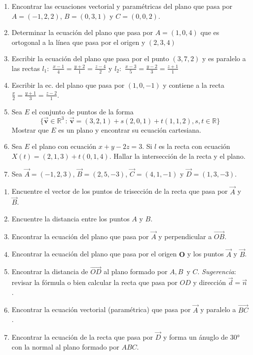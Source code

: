 \documentclass[
]{article}
\begin{document}
\begin{enumerate}
\def\labelenumi{\arabic{enumi}.}
\item
  Encontrar las ecuaciones vectorial y paramétricas del plano que pasa
  por \(A=(-1,2,2)\), \(B=(0,3,1)\) y \(C=(0,0,2)\).
\item
  Determinar la ecuación del plano que pasa por \(A=(1,0,4)\) que es
  ortogonal a la línea que pasa por el origen y \((2,3,4)\)
\item
  Escribir la ecuación del plano que pasa por el punto \((3,7,2)\) y es
  paralelo a las rectas \(l_1:\)
  \(\frac{x-1}{4}=\frac{y+2}{1}=\frac{z-4}{2}\) y \(l_2:\)
  \(\frac{x-3}{5}=\frac{y-2}{3}=\frac{z+1}{1}\)
\item
  Escribir la ec. del plano que pasa por \((1,0,-1)\) y contiene a la
  recta \(\frac{x}{2}=\frac{y+1}{3}=\frac{z-2}{1}\).
\item
  Sea \(E\) el conjunto de puntos de la forma \[
    \{ \vec{\mathbf{v}} \in \mathbb{R}^{3} \,:\, \vec{\mathbf{v}} = (3,2,1) + s (2,0,1) + t(1,1,2), s,t\in\mathbb{R}   \}
    \] Mostrar que \(E\) es un plano y encontrar su ecuación cartesiana.
\item
  Sea \(E\) el plano con ecuación \(x+y-2z=3\). Si \(l\) es la recta con
  ecuación \(X(t)=(2,1,3) + t(0,1,4)\). Hallar la intersección de la
  recta y el plano.
\item
  Sea \(\vec{A}=(-1,2,3)\), \(\vec{B}=(2,5,-3)\), \(\vec{C}=(4,1,-1)\) y
  \(\vec{D}=(1,3,-3)\).
\end{enumerate}

\begin{enumerate}
\def\labelenumi{\alph{enumi})}
\item
  Encuentre el vector de los puntos de trisección de la recta que pasa
  por \(\vec{A}\) y \(\vec{B}\).
\item
  Encuentre la distancia entre los puntos \(A\) y \(B\).
\item
  Encontrar la ecuación del plano que pasa por \(\vec{A}\) y
  perpendicular a \(\vec{OB}\).
\item
  Encontrar la ecuación del plano que pasa por el origen \(\textbf{O}\)
  y los puntos \(\vec{A}\) y \(\vec{B}\).
\item
  Encontrar la distancia de \(\vec{OD}\) al plano formado por
  \(A,B\,\mbox{ y } C\). \emph{Sugerencia}: revisar la fórmula o bien
  calcular la recta que pasa por \(OD\) y dirección \(\vec{d}=\vec{n}\).
\item
  Encontrar la ecuación vectorial (paramétrica) que pasa por \(\vec{A}\)
  y paralelo a \(\vec{BC}\).
\item
  Encontrar la ecuación de la recta que pasa por \(\vec{D}\) y forma un
  ánuglo de \(30°\) con la normal al plano formado por \(ABC\).
\end{enumerate}
\end{document}
